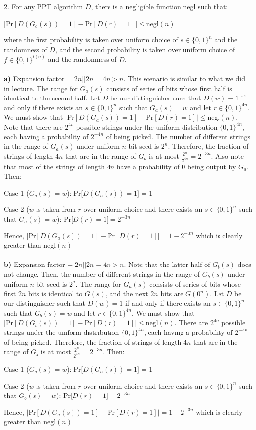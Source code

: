 \documentclass[12pt]{article}
\begin{document}
2. For any PPT algorithm $D$, there is a negligible function negl such that: 
\begin{center}
$|\text{Pr}[D(G_a(s)) = 1] - \text{Pr}[D(r) = 1]| \leq $negl$(n)$
\end{center}
where the first probability is taken over uniform choice of $s \in \{0,1\}^n$ and the randomness of $D$, and the second probability is taken over uniform choice of $f \in \{0,1\}^{l(n)}$ and the randomness of $D$.
\\
\\
\noindent \textbf{a)} Expansion factor = $2n||2n = 4n > n$. This scenario is similar to what we did in lecture. The range for $G_a(s)$ consists of series of bits whose first half is identical to the second half. Let $D$ be our distinguisher such that $D(w) = 1$ if and only if there exists an $s \in \{0,1\}^n$ such that $G_a(s) = w$ and let $r \in \{0,1\}^{4n}$. We must show that $|\text{Pr}[D(G_a(s)) = 1] - \text{Pr}[D(r) = 1]| \leq $negl$(n)$. Note that there are $2^{4n}$ possible strings under the uniform distribution $\{0,1\}^{4n}$, each having a probability of $2^{-4n}$ of being picked. The number of different strings in the range of $G_a(s)$ under uniform $n$-bit seed is $2^{n}$. Therefore, the fraction of strings of length 4$n$ that are in the range of $G_a$ is at most $\frac{2^{n}}{2^{4n}} = 2^{-3n}$. Also note that most of the strings of length $4n$ have a probability of 0 being output by $G_a$. Then: 

Case 1 ($G_a(s) = w$): Pr[$D(G_a(s)) = 1]$ = 1

Case 2 ($w$ is taken from $r$ over uniform choice and there exists an $s\in \{0,1\}^n$ such that $G_a(s)=w$): Pr[$D(r) = 1] = 2^{-3n}$

\noindent Hence, $|\text{Pr}[D(G_a(s)) = 1] - \text{Pr}[D(r) = 1]| = 1 - 2^{-3n}$ which is clearly greater than negl$(n)$.
\\
\\
\noindent \textbf{b)} Expansion factor = $2n||2n = 4n > n$. Note that the latter half of $G_b(s)$ does not change. Then, the number of different strings in the range of $G_b(s)$ under uniform $n$-bit seed is $2^{n}$. The range for $G_a(s)$ consists of series of bits whose first $2n$ bits is identical to $G(s)$, and the next $2n$ bits are $G(0^n)$. Let $D$ be our distinguisher such that $D(w) = 1$ if and only if there exists an $s \in \{0,1\}^n$ such that $G_b(s) = w$ and let $r \in \{0,1\}^{4n}$. We must show that $|\text{Pr}[D(G_b(s)) = 1] - \text{Pr}[D(r) = 1]| \leq $negl$(n)$. There are $2^{4n}$ possible strings under the uniform distribution $\{0,1\}^{4n}$, each having a probability of $2^{-4n}$ of being picked. Therefore, the fraction of strings of length 4$n$ that are in the range of $G_b$ is at most $\frac{2^{n}}{2^{4n}} = 2^{-3n}$. Then: 

Case 1 ($G_a(s) = w$): Pr[$D(G_a(s)) = 1]$ = 1

Case 2 ($w$ is taken from $r$ over uniform choice and there exists an $s\in \{0,1\}^n$ such that $G_b(s)=w$): Pr[$D(r) = 1] = 2^{-3n}$

\noindent Hence, $|\text{Pr}[D(G_a(s)) = 1] - \text{Pr}[D(r) = 1]| = 1 - 2^{-3n}$ which is clearly greater than negl$(n)$.
\end{document}
